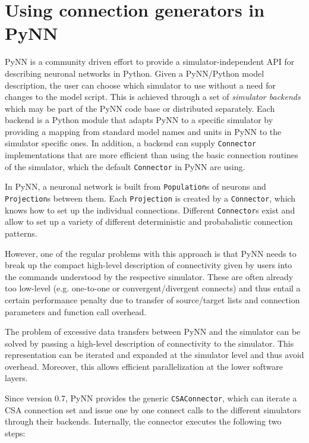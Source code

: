 \documentclass{frontiersSCNS} %
\begin{document}

\section{Using connection generators in PyNN}\label{sec:conn_gen_pynn}

PyNN \citep[\url{http://www.neuralensemble.org/PyNN};][]{Davison09} is
a community driven effort to provide a simulator-independent API for
describing neuronal networks in Python. Given a PyNN/Python model
description, the user can choose which simulator to use without a need
for changes to the model script. This is achieved through a set of
\emph{simulator backends} which may be part of the PyNN code base or
distributed separately. Each backend is a Python module that adapts
PyNN to a specific simulator by providing a mapping from standard
model names and units in PyNN to the simulator specific ones. In
addition, a backend can supply \verb|Connector| implementations that
are more efficient than using the basic connection routines of the
simulator, which the default \verb|Connector| in PyNN are using.

In PyNN, a neuronal network is built from \verb|Population|s of
neurons and \verb|Projection|s between them. Each \verb|Projection| is
created by a \verb|Connector|, which knows how to set up the
individual connections. Different \verb|Connector|s exist and allow to
set up a variety of different deterministic and probabalistic
connection patterns.

However, one of the regular problems with this approach is that PyNN
needs to break up the compact high-level description of connectivity
given by users into the commands understood by the respective
simulator. These are often already too low-level (e.g. one-to-one or
convergent/divergent connects) and thus entail a certain performance
penalty due to transfer of source/target lists and connection
parameters and function call overhead.

The problem of excessive data transfers between PyNN and the simulator
can be solved by passing a high-level description of connectivity to
the simulator. This representation can be iterated and expanded at the
simulator level and thus avoid overhead. Moreover, this allows
efficient parallelization at the lower software layers.

Since version 0.7, PyNN provides the generic \verb|CSAConnector|,
which can iterate a CSA connection set and issue one by one connect
calls to the different simulators through their backends. Internally,
the connector executes the following two steps:
\end{document}
